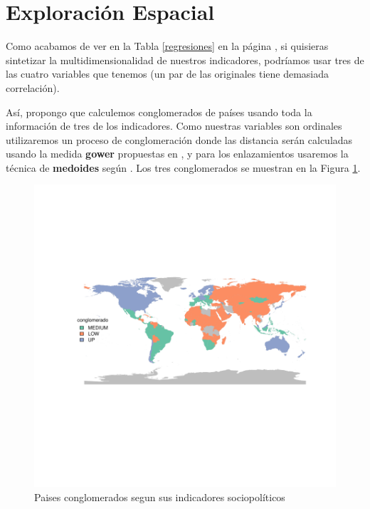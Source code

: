 \clearpage

\section{Exploración Espacial}

Como acabamos de ver en la Tabla \ref{regresiones} en la página \pageref{regresiones}, si quisieras sintetizar la multidimensionalidad de nuestros indicadores, podríamos usar tres de las cuatro variables que tenemos (un par de las originales tiene demasiada correlación). 

Así, propongo que calculemos conglomerados de países usando toda la información de tres de los indicadores. Como nuestras variables son ordinales utilizaremos un proceso de conglomeración donde las distancia serán calculadas usando la medida {\bf gower} propuestas en \cite{gower_general_1971}, y para los enlazamientos usaremos la técnica de {\bf medoides} según \cite{reynolds_clustering_2006}. Los tres conglomerados se muestran en la Figura \ref{clustmap}.






\begin{figure}[h]
\centering
\begin{adjustbox}{width=11cm,height=8cm,clip,trim=1cm 2.5cm 0cm 2.5cm}
\includegraphics{paperVersion_7_regresion-plotMap1}
\end{adjustbox}
\caption{Paises conglomerados segun sus indicadores sociopolíticos}\label{clustmap}
\end{figure}



\endinput
